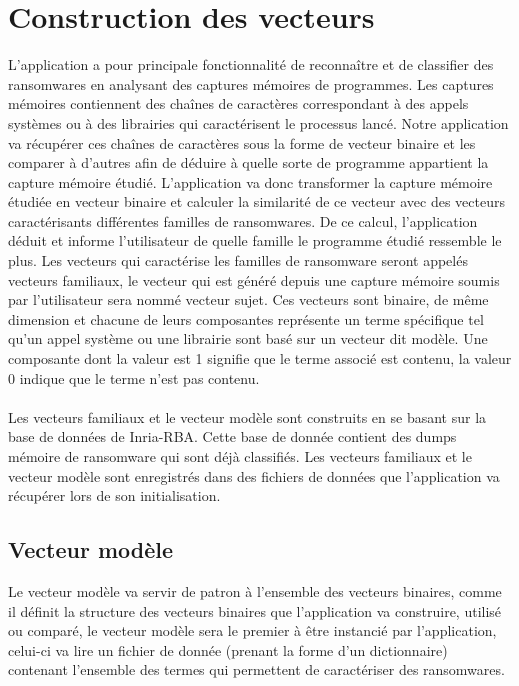 \documentclass[a4paper, 12pt]{book}
\begin{document}
\section{Construction des vecteurs}
L'application a pour principale fonctionnalité de reconnaître et de classifier des ransomwares en analysant des captures mémoires de programmes. Les captures mémoires contiennent des chaînes de caractères correspondant à des appels systèmes ou à des librairies qui caractérisent le processus lancé. Notre application va récupérer ces chaînes de caractères  sous la forme de vecteur binaire et les comparer à d'autres afin de déduire à quelle sorte de programme appartient la capture mémoire étudié. L'application va donc transformer la capture mémoire étudiée en vecteur binaire et calculer la similarité de ce vecteur avec des vecteurs caractérisants différentes familles de ransomwares. De ce calcul, l'application déduit et informe l'utilisateur de quelle famille le programme étudié ressemble le plus. Les vecteurs qui caractérise les familles de ransomware seront appelés vecteurs familiaux, le vecteur qui est généré depuis une capture mémoire soumis par l'utilisateur sera nommé vecteur sujet. Ces vecteurs sont binaire, de même dimension et chacune de leurs composantes représente un terme spécifique tel qu'un appel système ou une librairie sont basé sur un vecteur dit modèle. Une composante dont la valeur est 1 signifie que le terme associé est contenu, la valeur 0 indique que le terme n'est pas contenu. 
\paragraph{}
Les vecteurs familiaux et le vecteur modèle sont construits en se basant sur la base de données de Inria-RBA. Cette base de donnée contient des dumps mémoire de ransomware qui sont déjà classifiés. Les vecteurs familiaux et le vecteur modèle sont enregistrés dans des fichiers de données que l'application va récupérer lors de son initialisation.
\subsection{Vecteur modèle}
Le vecteur modèle va servir de patron à l'ensemble des vecteurs binaires, comme il définit la structure des vecteurs binaires que l'application va construire, utilisé ou comparé, le vecteur modèle sera le premier à être instancié par l'application, celui-ci va lire un fichier de donnée (prenant la forme d'un dictionnaire) contenant l'ensemble des termes qui permettent de caractériser des ransomwares.
\end{document}
